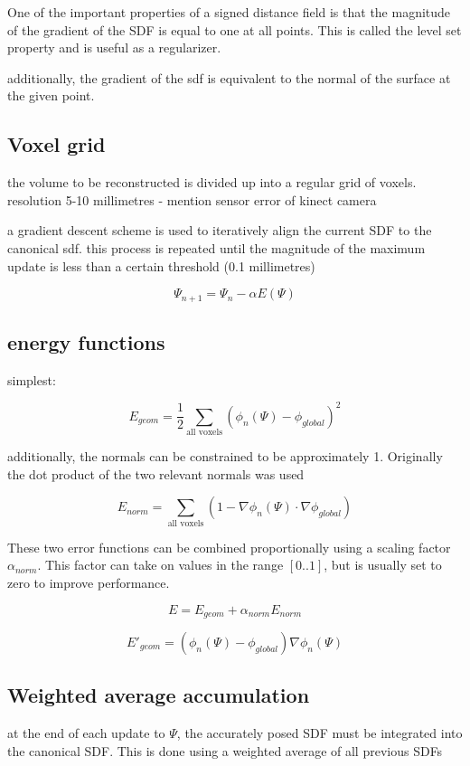 \documentclass[12pt,twoside]{report}
\begin{document}
One of the important properties of a signed distance field is that the magnitude of the gradient of the SDF is equal to one at all points. This is called the level set property and is useful as a regularizer.

additionally, the gradient of the sdf is equivalent to the normal of the surface at the given point.

\subsection{Voxel grid}

the volume to be reconstructed is divided up into a regular grid of voxels. resolution 5-10 millimetres - mention sensor error of kinect camera

a gradient descent scheme is used to iteratively align the current SDF to the canonical sdf. this process is repeated until the magnitude of the maximum update is less than a certain threshold (0.1 millimetres)

$$\Psi_{n+1} = \Psi_n - \alpha E(\Psi)$$




\subsection{energy functions}

simplest:

$$ E_{geom} = \frac{1}{2} \sum\limits_{\textrm{all voxels}} (\phi_n(\Psi) - \phi_{global})^2  $$


additionally, the normals can be constrained to be approximately 1. Originally the dot product of the two relevant normals was used

$$ E_{norm} = \sum\limits_{\textrm{all voxels}}(1 - \nabla \phi_n(\Psi) \cdot \nabla\phi_{global}) $$

These two error functions can be combined proportionally using a scaling factor $\alpha_{norm}$. This factor can take on values in the range $[0..1]$, but is usually set to zero to improve performance.

$$E = E_{geom} + \alpha_{norm}E_{norm}$$

$$ E'_{geom} = (\phi_n(\Psi) - \phi_{global}) \nabla \phi_n(\Psi)$$

\subsection{Weighted average accumulation}

at the end of each update to $\Psi$, the accurately posed SDF must be integrated into the canonical SDF. This is done using a weighted average of all previous SDFs
\end{document}
